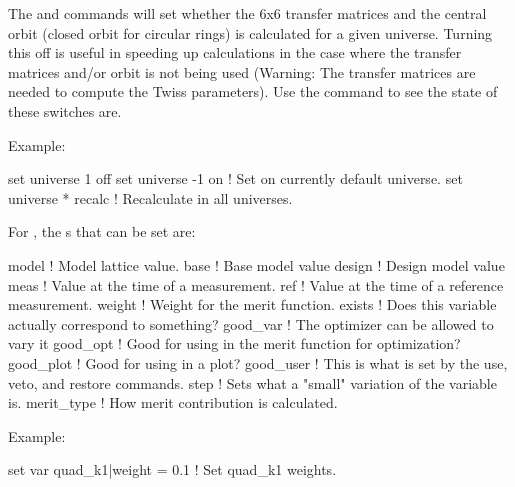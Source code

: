 {{\begin{description}
{{The  and  commands will set whether the 6x6
transfer matrices and the central orbit (closed orbit for circular
rings) is calculated for a given universe. Turning this off is useful
in speeding up calculations in the case where the transfer matrices and/or orbit
is not being used (Warning: The transfer matrices are needed to
compute the Twiss parameters). Use the  command to
see the state of these switches are.

Example:
\begin{example}
  set universe 1 off
  set universe -1 on    ! Set on currently default universe.
  set universe * recalc ! Recalculate in all universes.
\end{example}


\item[set var <var\_name>|<component> = <value>] \Newline

\vskip -0.2in

For , the s that can be set are:
\begin{example}
  model       ! Model lattice value.
  base        ! Base model value
  design      ! Design model value
  meas        ! Value at the time of a measurement.
  ref         ! Value at the time of a reference measurement.
  weight      ! Weight for the merit function.
  exists      ! Does this variable actually correspond to something?
  good_var    ! The optimizer can be allowed to vary it
  good_opt    ! Good for using in the merit function for optimization?
  good_plot   ! Good for using in a plot?
  good_user   ! This is what is set by the use, veto, and restore commands.
  step        ! Sets what a "small" variation of the variable is.
  merit_type  ! How merit contribution is calculated.
\end{example}

Example:
\begin{example}
  set var quad\_k1|weight = 0.1         ! Set quad\_k1 weights. 
\end{example}


\item[set wave <component> = <value>] \Newline

\vskip -0.2in

}}
\end{description}}}
